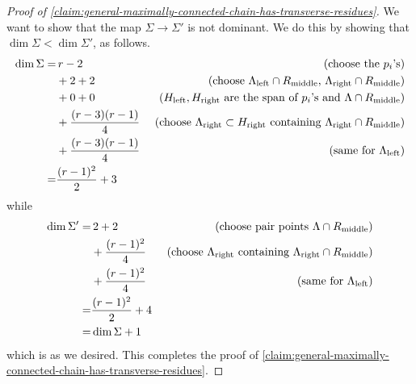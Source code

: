 \documentclass[11pt, two side, letterpaper, final]{amsart}
\begin{document}
\begin{proof}[Proof of \cref{claim:general-maximally-connected-chain-has-transverse-residues}]
 We want to show that the map $\Sigma \to \Sigma'$ is not dominant. We do this by showing that $\dim \Sigma < \dim \Sigma'$, as follows.
\begin{align*}
\dim \Sigma = & \,r-2 & \text{ (choose the $p_i$'s)}\\
& +2 + 2 & \text{ (choose $\Lambda_{\text{left}}\cap R_{\text{middle}}$, $\Lambda_{\text{right}} \cap R_{\text{middle}}$)} \\
& + 0 + 0 & \text{ ($H_{\text{left}}, H_{\text{right}}$ are the span of $p_i$'s and $\Lambda\cap R_{\text{middle}}$)}\\
& + \frac{(r-3)(r-1)}{4} & \text{ (choose $\Lambda_{\text{right}}\subset H_{\text{right}}$ containing $\Lambda_{\text{right}} \cap R_{\text{middle}}$)}\\&+\frac{(r-3)(r-1)}{4} & \text{ (same for $\Lambda_{\text{left}}$)}\\
 =& \frac{(r-1)^2}{2} +3 &
\end{align*}
while
\begin{align*}
\dim \Sigma' = &\, 2+2  & \text{ (choose pair points $\Lambda \cap R_{\text{middle}}$)}\\
& +\frac{(r-1)^2}{4} & \text{ (choose $\Lambda_{\text{right}}$ containing $\Lambda_{\text{right}} \cap R_{\text{middle}}$)}\\
&+\frac{(r-1)^2}{4} & \text{ (same for $\Lambda_{\text{left}}$)}\\
 = &\frac{(r-1)^2}{2}+4\\
 =&\dim \Sigma+1 &
\end{align*}
which is as we desired. This completes the proof of \cref{claim:general-maximally-connected-chain-has-transverse-residues}.
\end{proof}



 


\end{document}
